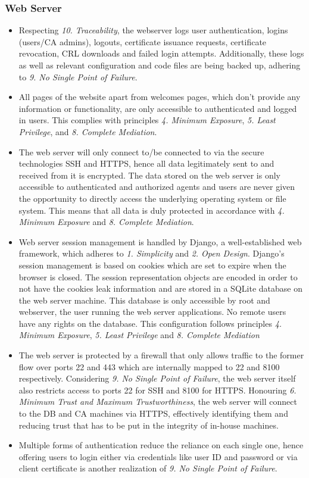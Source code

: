 \documentclass[english]{article}
\begin{document}
\subsubsection{Web Server}
\begin{itemize}
 \item Respecting \emph{10. Traceability}, the webserver logs user authentication, logins (users/CA admins), logouts, certificate issuance requests, certificate revocation, CRL downloads and failed login attempts. Additionally, these logs
 as well as relevant configuration and code files are being backed up, adhering to \emph{9. No Single Point of Failure}.
 \item All pages of the website apart from welcomes pages, which don't provide any information or functionality, are only accessible to authenticated and logged in users. This complies with principles \emph{4. Minimum Exposure}, \emph{5. Least Privilege},
 and \emph{8. Complete Mediation}.
 \item The web server will only connect to/be connected to via the secure technologies SSH and HTTPS, hence all data legitimately sent to and received from it is encrypted. The data stored on the web server is only accessible to authenticated
 and authorized agents and users are never given the opportunity to directly access the underlying operating system or file system. This means that all data is duly protected in accordance with \emph{4. Minimum Exposure} and \emph{8. Complete
 Mediation}.
 \item Web server session management is handled by Django, a well-established web framework, which adheres to \emph{1. Simplicity} and \emph{2. Open Design}. Django's session management is based on cookies which are set to expire when the browser
 is closed. The session representation objects are encoded in order to not have the cookies leak information and are stored in a SQLite database on the web server machine. This database is only accessible by root and webserver, the user running the
 web server applications. No remote users have any rights on the database. This configuration follows principles \emph{4. Minimum Exposure}, \emph{5. Least Privilege} and \emph{8. Complete Mediation}
 \item The web server is protected by a firewall that only allows traffic to the former flow over ports 22 and 443 which are internally mapped to 22 and 8100 respectively. Considering \emph{9. No Single Point of Failure}, the web server itself
 also restricts access to ports 22 for SSH and 8100 for HTTPS. Honouring \emph{6. Minimum Trust and Maximum Trustworthiness}, the web server will connect to the DB and CA machines via HTTPS, effectively identifying them and reducing trust that
 has to be put in the integrity of in-house machines.
 \item Multiple forms of authentication reduce the reliance on each single one, hence offering users to login either via credentials like user ID and password or via client certificate is another realization of \emph{9. No Single Point of Failure}.
\end{itemize}
\end{document}
